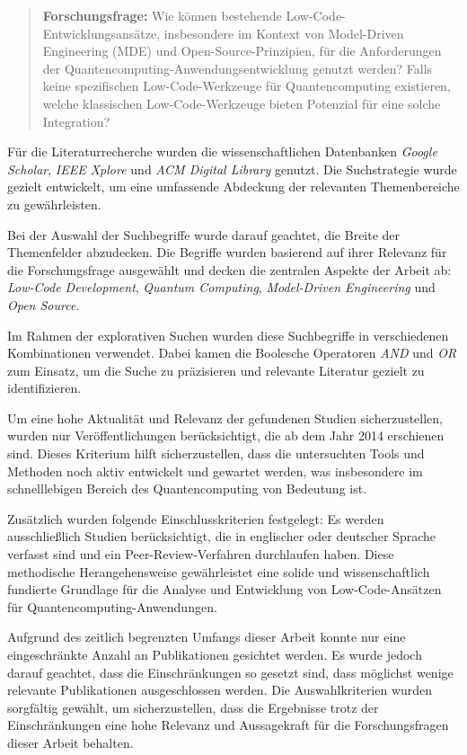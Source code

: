 \begin{quote}
    \textbf{Forschungsfrage:} Wie können bestehende Low-Code-Entwicklungsansätze, insbesondere im Kontext von 
    Model-Driven Engineering (MDE) und Open-Source-Prinzipien, für die Anforderungen der Quantencomputing-Anwendungsentwicklung 
    genutzt werden? Falls keine spezifischen Low-Code-Werkzeuge für Quantencomputing existieren, welche klassischen Low-Code-Werkzeuge 
    bieten Potenzial für eine solche Integration?
\label{research_question}
\end{quote}

Für die Literaturrecherche wurden die wissenschaftlichen Datenbanken \textit{Google Scholar}, \textit{IEEE Xplore} und 
\textit{ACM Digital Library} genutzt. Die Suchstrategie wurde gezielt entwickelt, um eine umfassende Abdeckung der relevanten 
Themenbereiche zu gewährleisten.

Bei der Auswahl der Suchbegriffe wurde darauf geachtet, die Breite der Themenfelder abzudecken. Die Begriffe wurden basierend 
auf ihrer Relevanz für die Forschungsfrage ausgewählt und decken die zentralen Aspekte der Arbeit ab:
\textit{Low-Code Development},
\textit{Quantum Computing},
\textit{Model-Driven Engineering} und
\textit{Open Source}.

Im Rahmen der explorativen Suchen wurden diese Suchbegriffe in verschiedenen Kombinationen verwendet. 
Dabei kamen die Boolesche Operatoren \textit{AND} und \textit{OR} zum Einsatz, um die Suche zu präzisieren 
und relevante Literatur gezielt zu identifizieren.

Um eine hohe Aktualität und Relevanz der gefundenen Studien sicherzustellen, wurden nur Veröffentlichungen berücksichtigt, 
die ab dem Jahr 2014 erschienen sind. Dieses Kriterium hilft sicherzustellen, dass die untersuchten Tools und Methoden noch 
aktiv entwickelt und gewartet werden, was insbesondere im schnelllebigen Bereich des Quantencomputing von Bedeutung ist.

Zusätzlich wurden folgende Einschlusskriterien festgelegt: Es werden ausschließlich Studien berücksichtigt, die in englischer 
oder deutscher Sprache verfasst sind und ein Peer-Review-Verfahren durchlaufen haben. Diese methodische Herangehensweise 
gewährleistet eine solide und wissenschaftlich fundierte Grundlage für die Analyse und Entwicklung von Low-Code-Ansätzen 
für Quantencomputing-Anwendungen.

Aufgrund des zeitlich begrenzten Umfangs dieser Arbeit konnte nur eine eingeschränkte Anzahl an Publikationen gesichtet werden. 
Es wurde jedoch darauf geachtet, dass die Einschränkungen so gesetzt sind, dass möglichst wenige relevante Publikationen 
ausgeschlossen werden. Die Auswahlkriterien wurden sorgfältig gewählt, um sicherzustellen, dass die Ergebnisse trotz der 
Einschränkungen eine hohe Relevanz und Aussagekraft für die Forschungsfragen dieser Arbeit behalten.

